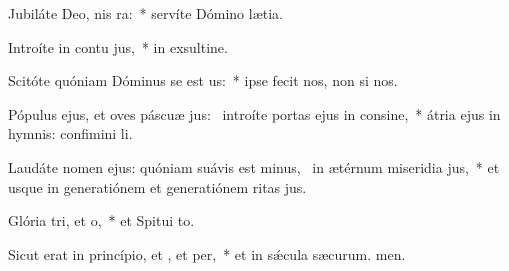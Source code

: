 \item Jubiláte Deo, nis ra:~* servíte Dómino  lætia.
\item Introíte in contu jus,~* in exsultine.
\item Scitóte quóniam Dóminus se est us:~* ipse fecit nos,  non si nos.
\item Pópulus ejus, et oves páscuæ jus:~\pscross{} introíte portas ejus in consine,~* átria ejus in hymnis: confimini li.
\item Laudáte nomen ejus: quóniam suávis est minus,~\pscross{} in ætérnum miseridia jus,~* et usque in generatiónem et generatiónem ritas jus.
\item Glória tri, et o,~* et Spitui to.
\item Sicut erat in princípio, et , et per,~* et in sǽcula sæcurum. men.
